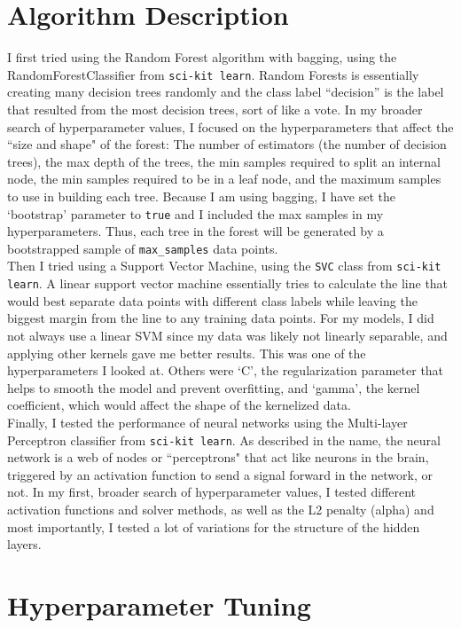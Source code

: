 \documentclass{article}
\begin{document}
\section*{Algorithm Description}
I first tried using the Random Forest algorithm with bagging, using the RandomForestClassifier from \texttt{sci-kit learn}. Random Forests is essentially creating many decision trees randomly and the class label ``decision'' is the label that resulted from the most decision trees, sort of like a vote. In my broader search of hyperparameter values, I focused on the hyperparameters that affect the ``size and shape" of the forest: The number of estimators (the number of decision trees), the max depth of the trees, the min samples required to split an internal node, the min samples required to be in a leaf node, and the maximum samples to use in building each tree. Because I am using bagging, I have set the `bootstrap' parameter to \texttt{true} and I included the max samples in my hyperparameters. Thus, each tree in the forest will be generated by a bootstrapped sample of \texttt{max\_samples} data points.
\bigskip \\Then I tried using a Support Vector Machine, using the \texttt{SVC} class from  \texttt{sci-kit learn}. A linear support vector machine essentially tries to calculate the line that would best separate data points with different class labels while leaving the biggest margin from the line to any training data points. For my models, I did not always use a linear SVM since my data was likely not linearly separable, and applying other kernels gave me better results. This was one of the hyperparameters I looked at. Others were `C', the regularization parameter that helps to smooth the model and prevent overfitting, and `gamma', the kernel coefficient, which would affect the shape of the kernelized data.
\bigskip \\Finally, I tested the performance of neural networks using the Multi-layer Perceptron classifier from \texttt{sci-kit learn}. As described in the name, the neural network is a web of nodes or ``perceptrons" that act like neurons in the brain, triggered by an activation function to send a signal forward in the network, or not. In my first, broader search of hyperparameter values, I tested different activation functions and solver methods, as well as the L2 penalty (alpha) and most importantly, I tested a lot of variations for the structure of the hidden layers. 
\section*{Hyperparameter Tuning}
\end{document}
